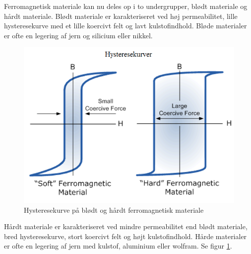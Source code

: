 Ferromagnetisk materiale kan nu deles op i to undergrupper, blødt materiale og hårdt materiale. Blødt materiale er karakteriseret ved høj permeabilitet, lille hysteresekurve med et lille koercivt felt og lavt kulstofindhold. Bløde materialer er ofte en legering af jern og silicium eller nikkel. \\
\begin{figure}
\includegraphics[scale=0.4]{./Graphics/Hysteresekurver}
\caption{Hysteresekurve på blødt og hårdt ferromagnetisk materiale}
\label{Hysteresekurve}
\end{figure}
Hårdt materiale er karakteriseret ved mindre permeabilitet end blødt materiale, bred hysteresekurve, stort koercivt felt og højt kulstofindhold. Hårde materialer er ofte en legering af jern med kulstof, aluminium eller wolfram. Se figur \ref{Hysteresekurve}. 

